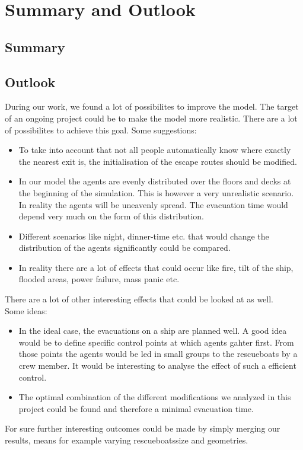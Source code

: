 \documentclass[11pt]{article}
\begin{document}
\section{Summary and Outlook}
\subsection{Summary}
\subsection{Outlook}
During our work, we found a lot of possibilites to improve the model. The target of an ongoing project could be to make the model more realistic. There are a lot of possibilites to achieve this goal.
\newline
Some suggestions:
\begin{itemize}
\item To take into account that not all people automatically know where exactly the nearest exit is, the initialisation of the escape routes should be modified.
\item In our model the agents are evenly distributed over the floors and decks at the beginning of the simulation. This is however a very unrealistic scenario. In reality the agents will be uneavenly spread. The evacuation time would depend very much on the form of this distribution.
\item Different scenarios like night, dinner-time etc. that would change the distribution of the agents significantly could be compared.
\item In reality there are a lot of effects that could occur like fire, tilt of the ship, flooded areas, power failure, mass panic etc.
\end{itemize}
There are a lot of other interesting effects that could be looked at as well.
\\
Some ideas:
\begin{itemize}
\item In the ideal case, the evacuations on a ship are planned well. A good idea would be to define specific control points at which agents gahter first. From those points the agents would be led in small groups to the rescueboats by a crew member. It would be interesting to analyse the effect of such a efficient control.
\item The optimal combination of the different modifications we analyzed in this project could be found and therefore a minimal evacuation time.
\end{itemize}
For sure further interesting outcomes could be made by simply merging our results, means for example varying rescueboatssize and geometries.
\end{document}
